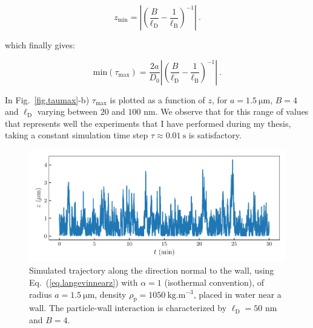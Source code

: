 \begin{equation}
	z_\mathrm{min} = \left| \left( \frac{B}{\ell_\mathrm{D}} - \frac{1}{\ell_{\mathrm{B}}}\right)^{-1} \right|~.
\end{equation}


which finally gives:

\begin{equation}
	\mathrm{min}(\tau_\mathrm{max}) =  \frac{2 a}{D_0}  \left| \left( \frac{B}{\ell_\mathrm{D}} - \frac{1}{\ell_{\mathrm{B}}}\right)^{-1} \right| ~.
\end{equation}

In Fig.~\ref{fig.taumax}-b) $\tau_{\mathrm{max}}$ is plotted as a function of $z$, for $a=1.5 ~\mathrm{\mu m}$, $B = 4$ and $\ell _\mathrm{D}$ varying between $20$ and $100$ nm. We observe that for this range of values that represents well the experiments that I have performed during my thesis, taking a constant simulation time step $\tau \approx 0.01 ~ \mathrm{s}$ is satisfactory.

\begin{figure}[H]
	\centering
	\includegraphics{02_body/chapter3/images/simulation_confined_Brownian_motion/z_traj_sim.pdf}
	\caption{Simulated trajectory along the direction normal to the wall, using Eq.~(\ref{eq.langevinnearz}) with $\alpha = 1$ (isothermal convention), of radius $a= 1.5  ~ \mathrm{\mu m}$, density $\rho_\mathrm{p} = 1050  ~\mathrm{kg.m^{-3}}$, placed in water near a wall. The particle-wall interaction is characterized by $\ell_\mathrm{D} = 50$ nm and $B=4$. \href{https://github.com/eXpensia/Confined-Brownian-Motion/blob/main/02_body/chapter3/images/simulation_confined_Brownian_motion/Overdamped_confined_simulation.ipynb}{\faGithub}} 
	\label{fig.z_traj_confined_simulated}
\end{figure}

